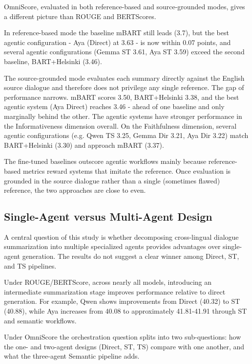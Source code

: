 \documentclass[11pt]{article}
\begin{document}
OmniScore, evaluated in both reference-based and source-grounded modes, gives a different picture than ROUGE and BERTScores.

In reference-based mode the baseline mBART still leads (3.7), but the best agentic configuration - Aya (Direct) at 3.63 - is now within 0.07 points, and several agentic configurations (Gemma ST 3.61, Aya ST 3.59) exceed the second baseline, BART+Helsinki (3.46). 

The source-grounded mode evaluates each summary directly against the English source dialogue and therefore does not privilege any single reference. The gap of performance narrows. mBART scores 3.50, BART+Helsinki 3.38, and the best agentic system (Aya Direct) reaches 3.46 - ahead of one baseline and only marginally behind the other. The agentic systems have stronger performance in the Informativeness dimension overall. On the Faithfulness dimension, several agentic configurations (e.g. Qwen TS 3.25, Gemma Dir 3.21, Aya Dir 3.22) match BART+Helsinki (3.30) and approach mBART (3.37).

The fine-tuned baselines outscore agentic workflows mainly because reference-based metrics reward systems that imitate the reference. Once evaluation is grounded in the source dialogue rather than a single (sometimes flawed) reference, the two approaches are close to even.

\subsection{Single-Agent versus Multi-Agent Design}

A central question of this study is whether decomposing cross-lingual dialogue summarization into multiple specialized agents provides advantages over single-agent generation. The results do not suggest a clear winner among Direct, ST, and TS pipelines.

Under ROUGE/BERTScore, across nearly all models, introducing an intermediate summarization stage improves performance relative to direct generation. For example, Qwen shows improvements from Direct (40.32) to ST (40.88), while Aya increases from 40.08 to approximately 41.81-41.91 through ST and semantic workflows.

Under OmniScore the orchestration question splits into two sub-questions: how the one- and two-agent designs (Direct, ST, TS) compare with one another, and what the three-agent Semantic pipeline adds.
\end{document}
